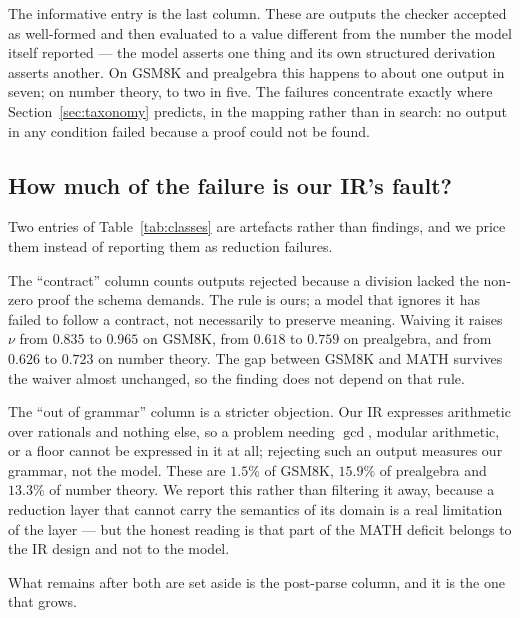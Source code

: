 \documentclass[11pt,a4paper]{article}
\begin{document}
The informative entry is the last column.  These are outputs the checker
accepted as well-formed and then evaluated to a value different from the number
the model itself reported --- the model asserts one thing and its own structured
derivation asserts another.  On GSM8K and prealgebra this happens to about one
output in seven; on number theory, to two in five.  The failures concentrate
exactly where Section~\ref{sec:taxonomy} predicts, in the mapping rather than in
search: no output in any condition failed because a proof could not be found.

\subsection{How much of the failure is our IR's fault?}
\label{sec:sensitivity}
\label{sec:protocol-sens}
Two entries of Table~\ref{tab:classes} are artefacts rather than findings, and
we price them instead of reporting them as reduction failures.

The ``contract'' column counts outputs rejected because a division lacked the
non-zero proof the schema demands.  The rule is ours; a model that ignores it has
failed to follow a contract, not necessarily to preserve meaning.  Waiving it
raises $\nu$ from $0.835$ to $0.965$ on GSM8K, from $0.618$ to $0.759$ on
prealgebra, and from $0.626$ to $0.723$ on number theory.  The gap between
GSM8K and MATH survives the waiver almost unchanged, so the finding does not
depend on that rule.

The ``out of grammar'' column is a stricter objection.  Our IR expresses
arithmetic over rationals and nothing else, so a problem needing $\gcd$, modular
arithmetic, or a floor cannot be expressed in it at all; rejecting such an output
measures our grammar, not the model.  These are $1.5\%$ of GSM8K, $15.9\%$ of
prealgebra and $13.3\%$ of number theory.  We report this rather than filtering
it away, because a reduction layer that cannot carry the semantics of its domain
is a real limitation of the layer --- but the honest reading is that part of the
MATH deficit belongs to the IR design and not to the model.

What remains after both are set aside is the post-parse column, and it is the one
that grows.
\end{document}
